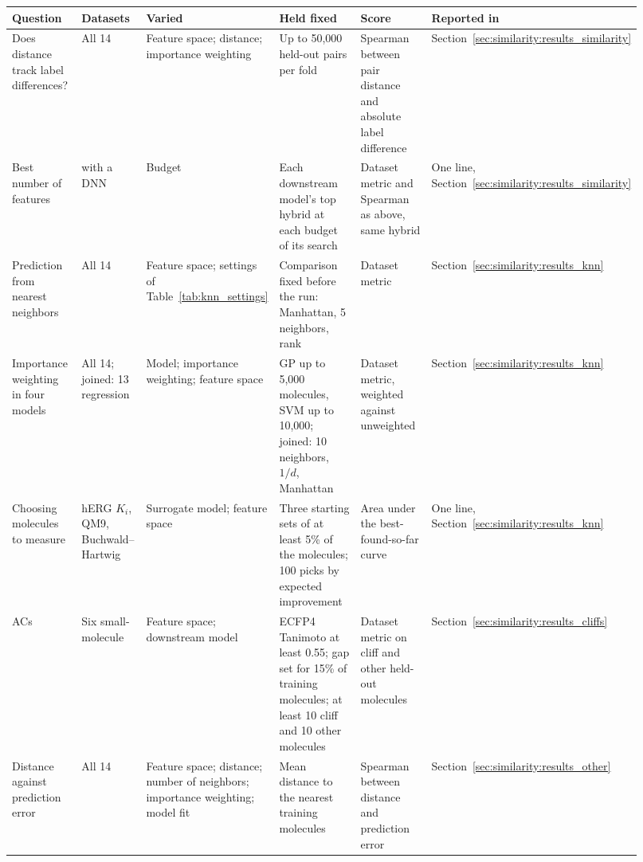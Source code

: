\begin{table}[htbp]
\centering
\scriptsize
\begin{adjustbox}{max width=\textwidth,max totalheight=0.85\textheight}
\begin{tabular}{@{}>{\raggedright\arraybackslash}p{0.14\linewidth}>{\raggedright\arraybackslash}p{0.11\linewidth}>{\raggedright\arraybackslash}p{0.18\linewidth}>{\raggedright\arraybackslash}p{0.21\linewidth}>{\raggedright\arraybackslash}p{0.17\linewidth}>{\raggedright\arraybackslash}p{0.11\linewidth}@{}}
\toprule
Question & Datasets & Varied & Held fixed & Score & Reported in \\
\midrule
Does distance track label differences? & All 14 & Feature space; distance; importance weighting & Up to 50,000 held-out pairs per fold & Spearman between pair distance and absolute label difference & Section~\ref{sec:similarity:results_similarity} \\
Best number of features & 11 with a DNN & Budget & Each downstream model's top hybrid at each budget of its search & Dataset metric and Spearman as above, same hybrid & One line, Section~\ref{sec:similarity:results_similarity} \\
Prediction from nearest neighbors & All 14 & Feature space; settings of Table~\ref{tab:knn_settings} & Comparison fixed before the run: Manhattan, 5 neighbors, rank & Dataset metric & Section~\ref{sec:similarity:results_knn} \\
Importance weighting in four models & All 14; joined: 13 regression & Model; importance weighting; feature space & GP up to 5,000 molecules, SVM up to 10,000; joined: 10 neighbors, $1/d$, Manhattan & Dataset metric, weighted against unweighted & Section~\ref{sec:similarity:results_knn} \\
Choosing molecules to measure & hERG $K_i$, QM9, Buchwald--Hartwig & Surrogate model; feature space & Three starting sets of at least 5\% of the molecules; 100 picks by expected improvement & Area under the best-found-so-far curve & One line, Section~\ref{sec:similarity:results_knn} \\
ACs & Six small-molecule & Feature space; downstream model & ECFP4 Tanimoto at least 0.55; gap set for 15\% of training molecules; at least 10 cliff and 10 other molecules & Dataset metric on cliff and other held-out molecules & Section~\ref{sec:similarity:results_cliffs} \\
Distance against prediction error & All 14 & Feature space; distance; number of neighbors; importance weighting; model fit & Mean distance to the nearest training molecules & Spearman between distance and prediction error & Section~\ref{sec:similarity:results_other} \\

\end{tabular}
\end{adjustbox}
\end{table}
